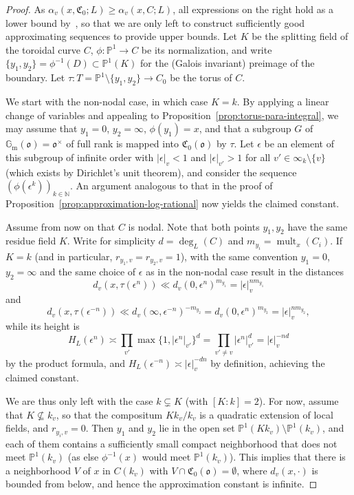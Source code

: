 \documentclass[a4paper, twoside, 11pt]{amsart}
\theoremstyle{definition}
\newcommand{\mC}{\mathfrak{C}}
\newcommand{\fo}{\mathfrak{o}}
\newcommand{\NN}{\mathbb{N}}
\newcommand{\PP}{\mathbb{P}}
\newcommand{\Gm}{\mathbb{G}_\mathrm{m}}
\DeclareMathOperator{\mult}{mult}
\begin{document}
\begin{proof}
	As $\alpha_v(x,\mC_0;L) \geq\alpha_v(x,C;L)$, all expressions on the right hold as a lower bound by~\cite[Thm.~2.16]{McK-Roth}, so that we are only left to construct sufficiently good approximating sequences to provide upper bounds. 
 	Let $K$ be the splitting field of the toroidal curve $C$, $\phi\colon \PP^1\to C$ be its normalization, and write $\{y_1,y_2\}=\phi^{-1}(D)\subset \PP^1(K)$ for the (Galois invariant) preimage of the boundary. Let $\tau\colon T=\PP^1\setminus \{y_1,y_2\}\to C_0$ be the torus of $C$. 

	We start with the non-nodal case, in which case $K=k$.
    By applying a linear change of variables and appealing to Proposition~\ref{prop:torus-para-integral}, we may assume that $y_1=0$, $y_2=\infty$, $\phi(y_1)=x$, and that a subgroup $G$ of $\Gm(\fo)=\fo^\times$ of full rank is mapped into $\mC_0(\fo)$ by $\tau$. Let $\epsilon$ be an element of this subgroup of infinite order with $|\epsilon|_v<1$ and $|\epsilon|_{v'}>1$ for all $v'\in \infty_k\setminus\{v\}$ (which exists by Dirichlet's unit theorem), and consider the sequence $(\phi(\epsilon^k))_{k\in\NN}$. An argument analogous to that in the proof of 
	Proposition~\ref{prop:approximation-log-rational} now yields the claimed constant.

	Assume from now on that $C$ is nodal. Note that both points $y_1,y_2$ have the same residue field $K$. Write for simplicity $d= \deg_L(C)$ and  $m_{y_i}=\mult_{x}(C_i)$.  If $K=k$ (and in particular, $r_{{y_1},v}=r_{{y_2},v}=1$), with the same convention $y_1=0$, $y_2=\infty$ and the same choice of $\epsilon$ as in the non-nodal case result in the distances
	\begin{equation*}
		d_v(x,\tau(\epsilon^n)) \ll d_v(0,\epsilon^{n})^{m_{y_1}} = |\epsilon|_v^{n m_{y_1}}
	\end{equation*}
	and 
	\begin{equation*}
		d_v(x,\tau(\epsilon^{-n})) \ll d_v(\infty,\epsilon^{-n})^{-m_{y_2}} = d_v( 0,\epsilon^n)^{m_{y_2}} = |\epsilon|_v^{n m_{y_2}},
	\end{equation*}
	while its height is $$H_L(\epsilon^n) \asymp \prod_{v'}\max\{1,|\epsilon^n|_{v'}\}^d = \prod_{v'\ne v} |\epsilon^n|_{v'}^d = |\epsilon|_v^{-nd}$$ by the product formula,  and $H_L(\epsilon^{-n}) \asymp |\epsilon|^{-dn}_v$ by definition, achieving the claimed constant.

	We are thus only left with the case $k\subsetneq K$ (with $[K:k]=2$).
	For now, assume that $K\nsubseteq k_v$, so that the compositum $Kk_v/k_v$ is a quadratic extension of local fields, and $r_{y_i,v}=0$. Then $y_1$ and $y_2$ lie in the open set $\PP^1(Kk_v)\setminus \PP^1(k_v)$, and each of them contains a sufficiently small compact neighborhood that does not meet $\PP^1(k_v)$ (as else $\phi^{-1}(x)$ would meet $\PP^1(k_v)$). 
    This implies that there is a neighborhood $V$ of $x$ in $C(k_v)$ with $V\cap \mC_0(\fo)=\emptyset$, where  $d_v(x, \cdot)$ is bounded from below, and hence the approximation constant is infinite.


\end{proof}
\end{document}
